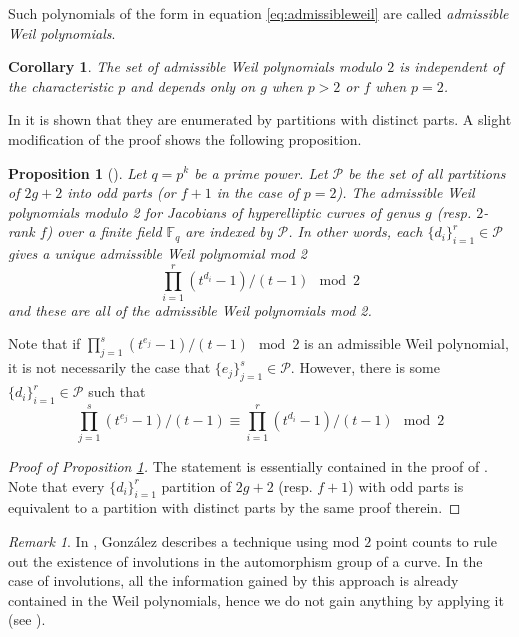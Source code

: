 \documentclass[12pt]{amsart}
\newcommand{\F}{\mathbb{F}}
\newcommand{\calP}{\mathcal{P}}
\numberwithin{equation}{subsection}
\theoremstyle{plain}\newtheorem{ithm}{Theorem}
\theoremstyle{plain}\newtheorem{iprop}[ithm]{Proposition}
\newtheorem{corollary}[equation]{Corollary}
\newtheorem{proposition}[equation]{Proposition}
\theoremstyle{definition}
\theoremstyle{remark}
\newtheorem{remark}[equation]{Remark}
\newcommand{\defi}[1]{\emph{#1}} %
\begin{document}
Such polynomials of the form in equation \eqref{eq:admissibleweil} are called \defi{admissible Weil polynomials}. 
\begin{corollary}
The set of admissible Weil polynomials modulo $2$ is independent of the characteristic $p$ and depends only on $g$ when $p>2$ or  $f$ when $p = 2$.
\end{corollary}

In  \cite[Proposition 2.10]{CostaWeilPolys} it is shown that they are enumerated by partitions with distinct parts. A slight modification of the proof shows the following proposition.
\begin{proposition}[{\cite[Proposition 2.10]{CostaWeilPolys}}]
\label{prop:weilparity}
Let $q = p^k$ be a prime power.
Let $\calP$ be the set of all partitions of $2g+2$ into odd parts (or $f+1$ in the case of $p = 2$).
The admissible Weil polynomials modulo 2 for Jacobians of hyperelliptic curves of genus $g$ (resp. $2$-rank $f$) over a finite field $\F_q$ are indexed by $\calP$. In other words, each $\{d_i\}_{i = 1}^r \in \calP$  gives a unique admissible Weil polynomial mod 2
\[\prod_{i=1}^r (t^{d_i} - 1) / (t - 1) \mod 2 \]
and these are all of the admissible Weil polynomials mod 2.
\end{proposition}

Note that if $\prod_{j=1}^s (t^{e_j} - 1) / (t - 1) \mod 2$
is an admissible Weil polynomial, it is not necessarily the case that $\{e_j\}_{j=1}^s \in \calP$. However, there is some $\{d_i\}_{i = 1}^r \in \calP$ such that
\[\prod_{j=1}^s (t^{e_j} - 1) / (t - 1)\equiv\prod_{i=1}^r (t^{d_i} - 1) / (t - 1)  \mod 2  \]
\begin{proof}[Proof of Proposition \ref{prop:weilparity}]
The statement is essentially contained in the proof of \cite[Proposition 2.10]{CostaWeilPolys}. Note that every $\{d_i\}_{i = 1}^r$ partition of $2g+2$ (resp. $f+1$) with odd parts is equivalent to a partition with distinct parts by the same proof therein.
\end{proof}

\begin{remark}
In  \cite[Remark 2.2]{GonzalezAut}, Gonz\'alez  describes a technique using mod $2$ point counts to rule out the existence of involutions in the automorphism group of a curve. 
In the case of involutions, all the information gained by this  approach is already contained in the Weil polynomials, hence we do not gain anything by applying it (see \cite[Section 4.1]{CostaWeilPolys}).
\end{remark}
\end{document}
